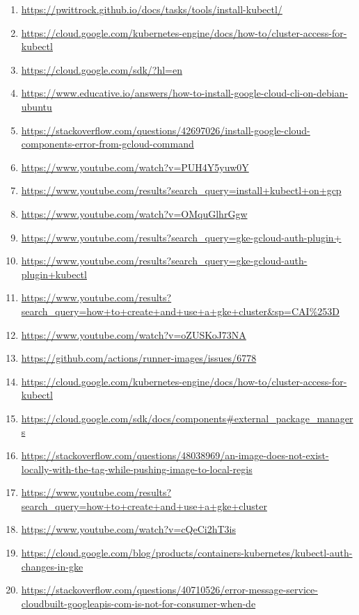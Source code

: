 \documentclass[12pt]{article}
\begin{document}
\begin{enumerate}[label=\arabic*.,itemsep=0pt,parsep=0pt]

      \item \url{https://pwittrock.github.io/docs/tasks/tools/install-kubectl/}
      \item \url{https://cloud.google.com/kubernetes-engine/docs/how-to/cluster-access-for-kubectl}
      \item \url{https://cloud.google.com/sdk/?hl=en}
      \item \url{https://www.educative.io/answers/how-to-install-google-cloud-cli-on-debian-ubuntu}
      \item \url{https://stackoverflow.com/questions/42697026/install-google-cloud-components-error-from-gcloud-command}
      \item \url{https://www.youtube.com/watch?v=PUH4Y5yuw0Y}
      \item \url{https://www.youtube.com/results?search_query=install+kubectl+on+gcp}
      \item \url{https://www.youtube.com/watch?v=OMquGlhrGgw}
      \item \url{https://www.youtube.com/results?search_query=gke-gcloud-auth-plugin+}
      \item \url{https://www.youtube.com/results?search_query=gke-gcloud-auth-plugin+kubectl}
      \item \url{https://www.youtube.com/results?search_query=how+to+create+and+use+a+gke+cluster&sp=CAI%253D}
      \item \url{https://www.youtube.com/watch?v=oZUSKoJ73NA}
      \item \url{https://github.com/actions/runner-images/issues/6778}
      \item \url{https://cloud.google.com/kubernetes-engine/docs/how-to/cluster-access-for-kubectl}
      \item \url{https://cloud.google.com/sdk/docs/components#external_package_managers}
      \item \url{https://stackoverflow.com/questions/48038969/an-image-does-not-exist-locally-with-the-tag-while-pushing-image-to-local-regis}
      \item \url{https://www.youtube.com/results?search_query=how+to+create+and+use+a+gke+cluster}
      \item \url{https://www.youtube.com/watch?v=cQeCi2hT3is}
      \item \url{https://cloud.google.com/blog/products/containers-kubernetes/kubectl-auth-changes-in-gke}
      \item \url{https://stackoverflow.com/questions/40710526/error-message-service-cloudbuilt-googleapis-com-is-not-for-consumer-when-de}

\end{enumerate}
\end{document}
